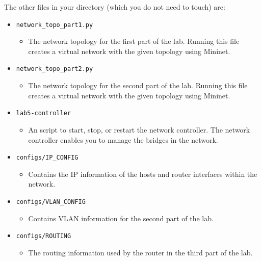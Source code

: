 \documentclass[11pt]{article}
\begin{document}
The other files in your directory (which you do not need to touch) are:
\begin{itemize}
    \item \texttt{network\_topo\_part1.py}
        \begin{itemize}
            \item The network topology for the first part of the lab. Running this file creates a virtual network with the given topology using Mininet.
        \end{itemize}

    \item \texttt{network\_topo\_part2.py}
        \begin{itemize}
            \item The network topology for the second part of the lab. Running this file creates a virtual network with the given topology using Mininet.
        \end{itemize}

    \item \texttt{lab5-controller}
        \begin{itemize}
            \item An script to start, stop, or restart the network controller. The network controller enables you to manage the bridges in the network.
        \end{itemize}

    \item \texttt{configs/IP\_CONFIG}
        \begin{itemize}
            \item Contains the IP information of the hosts and router interfaces within the network.
        \end{itemize}

    \item \texttt{configs/VLAN\_CONFIG}
        \begin{itemize}
            \item Contains VLAN information for the second part of the lab.
        \end{itemize}

    \item \texttt{configs/ROUTING}
        \begin{itemize}
            \item The routing information used by the router in the third part of the lab.
        \end{itemize}
\end{itemize}
\end{document}
